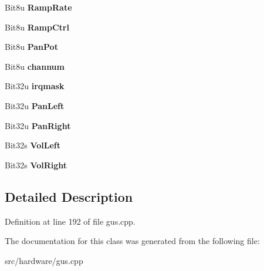 \begin{DoxyCompactItemize}
\item 
\hypertarget{classGUSChannels_a795f8eff74ef91bcd3f2e56786b2ae7f}{Bit8u {\bfseries Ramp\-Rate}}\label{classGUSChannels_a795f8eff74ef91bcd3f2e56786b2ae7f}

\item 
\hypertarget{classGUSChannels_a5e53c3d380059e69241d4c2228d6b963}{Bit8u {\bfseries Ramp\-Ctrl}}\label{classGUSChannels_a5e53c3d380059e69241d4c2228d6b963}

\item 
\hypertarget{classGUSChannels_adfc57391f631967a421c68151bc8d406}{Bit8u {\bfseries Pan\-Pot}}\label{classGUSChannels_adfc57391f631967a421c68151bc8d406}

\item 
\hypertarget{classGUSChannels_ac4025f25e64fc8c0f235cdd513faf16b}{Bit8u {\bfseries channum}}\label{classGUSChannels_ac4025f25e64fc8c0f235cdd513faf16b}

\item 
\hypertarget{classGUSChannels_ab2ef78abf686814c7473539bcc197bb5}{Bit32u {\bfseries irqmask}}\label{classGUSChannels_ab2ef78abf686814c7473539bcc197bb5}

\item 
\hypertarget{classGUSChannels_a4285b8115475dff18dea76784d83ba7c}{Bit32u {\bfseries Pan\-Left}}\label{classGUSChannels_a4285b8115475dff18dea76784d83ba7c}

\item 
\hypertarget{classGUSChannels_a09b3ccc1cf8099c083e3c238ad1d8778}{Bit32u {\bfseries Pan\-Right}}\label{classGUSChannels_a09b3ccc1cf8099c083e3c238ad1d8778}

\item 
\hypertarget{classGUSChannels_a0aeb797744c172611694b90b15d50e56}{Bit32s {\bfseries Vol\-Left}}\label{classGUSChannels_a0aeb797744c172611694b90b15d50e56}

\item 
\hypertarget{classGUSChannels_a65730a7c7a5b4b64ca4519604a44b56c}{Bit32s {\bfseries Vol\-Right}}\label{classGUSChannels_a65730a7c7a5b4b64ca4519604a44b56c}

\end{DoxyCompactItemize}


\subsection{Detailed Description}


Definition at line 192 of file gus.\-cpp.



The documentation for this class was generated from the following file\-:\begin{DoxyCompactItemize}
\item 
src/hardware/gus.\-cpp\end{DoxyCompactItemize}
